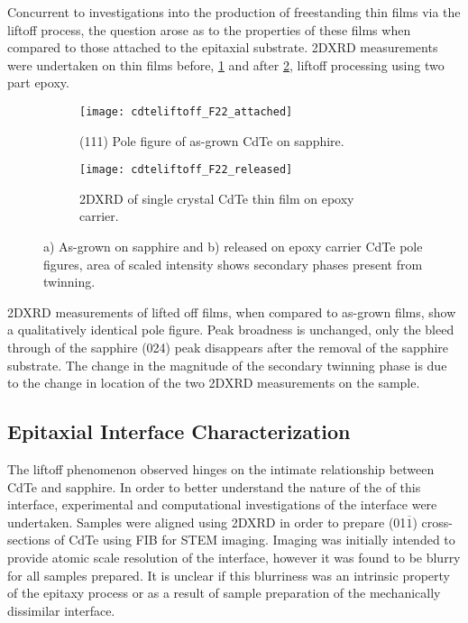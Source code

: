 Concurrent to investigations into the production of freestanding thin films via the liftoff process, the question arose as to the properties of these films when compared to those attached to the epitaxial substrate.
2DXRD measurements were undertaken on thin films before, \cref{fig:cdteliftoff_F22_attached} and after \cref{fig:cdteliftoff_F22_released}, liftoff processing using two part epoxy.
\begin{figure}
 \centering
 \begin{subfigure}[b]{0.45\textwidth}
  \centering \texttt{[image: cdteliftoff\_F22\_attached]}
  \caption{\label{fig:cdteliftoff_F22_attached}(111) Pole figure of as-grown CdTe on sapphire.}
 \end{subfigure}\quad%
 \begin{subfigure}[b]{0.45\textwidth}
  \centering \texttt{[image: cdteliftoff\_F22\_released]}
  \caption{\label{fig:cdteliftoff_F22_released}2DXRD of single crystal CdTe thin film on epoxy carrier.}
 \end{subfigure}%
 \caption{\label{fig:cdteliftoff_2DXRD}a) As-grown on sapphire and b) released on epoxy carrier CdTe pole figures, area of scaled intensity shows secondary phases present from twinning.}
\end{figure}
2DXRD measurements of lifted off films, when compared to as-grown films, show a qualitatively identical pole figure.
Peak broadness is unchanged, only the bleed through of the sapphire (024) peak disappears after the removal of the sapphire substrate.
The change in the magnitude of the secondary twinning phase is due to the change in location of the two 2DXRD measurements on the sample.

\subsection{Epitaxial Interface Characterization}
The liftoff phenomenon observed hinges on the intimate relationship between CdTe and sapphire.
In order to better understand the nature of the of this interface, experimental and computational investigations of the interface were undertaken.
Samples were aligned using 2DXRD in order to prepare (01\(\overline{1}\)) cross-sections of CdTe using FIB for STEM imaging.
Imaging was initially intended to provide atomic scale resolution of the interface, however it was found to be blurry for all samples prepared.
It is unclear if this blurriness was an intrinsic property of the epitaxy process or as a result of sample preparation of the mechanically dissimilar interface.

